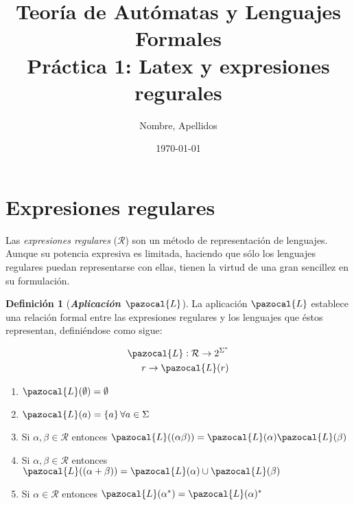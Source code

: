 \documentclass[fleqn, 10pt]{article}
\title{Teoría de Autómatas y Lenguajes Formales\\[.4\baselineskip]Práctica 1: Latex y expresiones regurales}
\author{Nombre, Apellidos}
\date{\today}
\newcommand{\Lb}{\pazocal{L}}
\theoremstyle{plain}
\theoremstyle{definition}
\newtheorem{definition}{Definición}[section]
\begin{document}
\maketitle

\section{Expresiones regulares}

Las \textit{expresiones regulares} ($\mathcal{R}$) son un método de representación de
lenguajes. Aunque su potencia expresiva es limitada, haciendo que sólo los
lenguajes regulares puedan representarse con ellas, tienen la virtud de una gran
sencillez en su formulación.


\begin{definition}[\textbf{\textit{Aplicación $\Lb$}}]\label{def:aplicL}
	La aplicación $\Lb$ establece una relación formal entre las expresiones regulares y los lenguajes que éstos representan, definiéndose como sigue:
  \begin{ceqn}	%
    \begin{align*} %
    \Lb: \mathcal{R} \rightarrow 2^{\Sigma^*}\\ 
    r \rightarrow \Lb(r)
    \end{align*} 
  \end{ceqn} 
  
\begin{enumerate}[label=\alph{enumi})]
  \item $\Lb(\emptyset)=\emptyset$ 
  \item $\Lb(a)=\{a\} \, \forall a\in\Sigma$ 
  \item Si $\alpha,\beta \in \mathcal{R}$ entonces $\Lb((\alpha\beta))=\Lb(\alpha)\Lb(\beta)$
  \item Si $\alpha,\beta \in \mathcal{R}$ entonces $\Lb((\alpha+\beta))=\Lb(\alpha)\cup \Lb(\beta)$
  \item Si $\alpha \in \mathcal{R}$ entonces $\Lb(\alpha^*)=\Lb(\alpha)^*$
\end{enumerate}

\end{definition}
\end{document}
